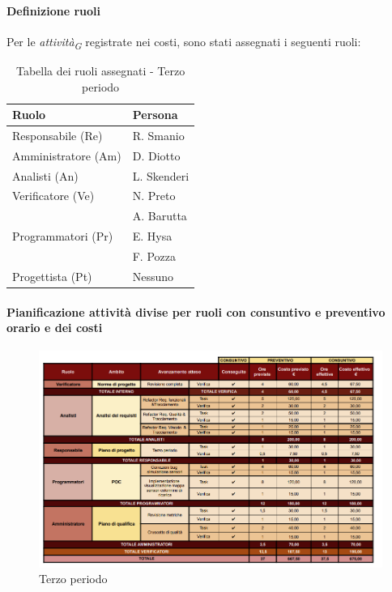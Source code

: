 \paragraph{Definizione ruoli} 
Per le \textit{attività}\textsubscript{\textit{G}} registrate nei costi, sono stati assegnati i seguenti ruoli:  

\vspace{0.4cm}

\begin{table}[H]
    \centering
    \begin{tabular}{|L{4cm}|L{2cm}|}
    \hline
    \textbf{Ruolo} & \textbf{Persona} \\
    \hline
    \hline
    Responsabile (Re)   & R. Smanio \\
    \hline
    Amministratore (Am) & D. Diotto \\
    \hline
    Analisti (An)       & L. Skenderi \\
    \hline
    Verificatore (Ve)   & N. Preto \\
                        & A. Barutta \\
    \hline
    Programmatori (Pr)  & E. Hysa \\
                        & F. Pozza \\
    \hline
    Progettista (Pt)    & Nessuno \\
    \hline
    \end{tabular}
    \caption{Tabella dei ruoli assegnati - Terzo periodo}
    \label{tab:Ruoli_persone_3}
    \end{table}

\newpage
\paragraph{Pianificazione attività divise per ruoli con consuntivo e preventivo orario e dei costi}

\begin{figure}[H]
    \centering
    \includegraphics[width=\linewidth, height=0.9\textheight, keepaspectratio]{../Images/tabG3.PNG}
    \caption{Terzo periodo}
    \label{fig:Terzo_periodo}
\end{figure}

